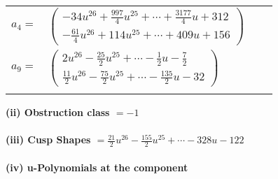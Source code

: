 \documentclass[1p]{elsarticle_modified}
\theoremstyle{definition}
\begin{document}
\begin{tabular}{m{7pt} m{180pt} m{7pt} m{180pt} }
\flushright $a_{4}=$&$\begin{pmatrix}-34 u^{26}+\frac{997}{4} u^{25}+\cdots+\frac{3177}{4} u+312\\-\frac{61}{4} u^{26}+114 u^{25}+\cdots+409 u+156\end{pmatrix}$ \\
\flushright $a_{9}=$&$\begin{pmatrix}2 u^{26}-\frac{25}{2} u^{25}+\cdots-\frac{1}{2} u-\frac{7}{2}\\\frac{11}{2} u^{26}-\frac{75}{2} u^{25}+\cdots-\frac{135}{2} u-32\end{pmatrix}$\\&\end{tabular}
\flushleft \textbf{(ii) Obstruction class $= -1$}\\~\\
\flushleft \textbf{(iii) Cusp Shapes $= \frac{21}{2} u^{26}-\frac{155}{2} u^{25}+\cdots-328 u-122$}\\~\\
\newpage\renewcommand{\arraystretch}{1}
\flushleft \textbf{(iv) u-Polynomials at the component}\newline \\
\end{document}
